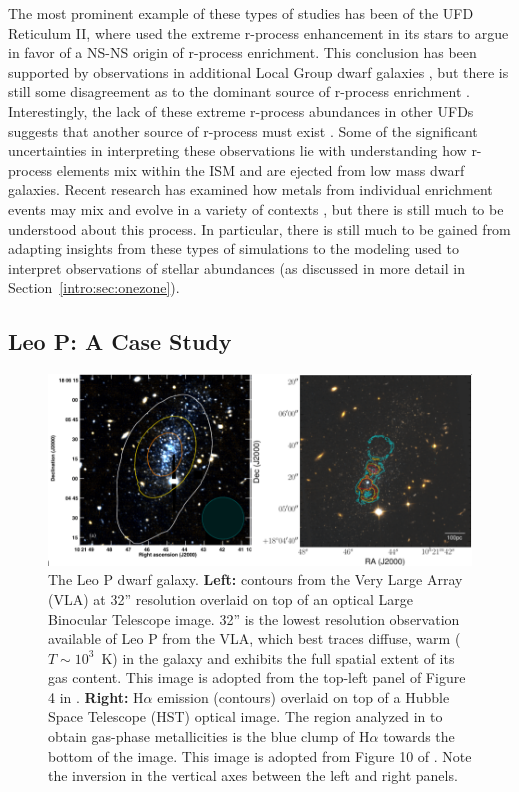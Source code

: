 The most prominent example of these types of studies has been of the UFD Reticulum II, where \cite{Ji2016} used the extreme r-process enhancement in its stars to argue in favor of a NS-NS origin of r-process enrichment. This conclusion has been supported by observations in additional Local Group dwarf galaxies \citep{Duggan2018}, but there is still some disagreement as to the dominant source of r-process enrichment \citep[e.g.][]{Siegel2018}. Interestingly, the lack of these extreme r-process abundances in other UFDs suggests that another source of r-process must exist \citep{Ji2016b}. Some of the significant uncertainties in interpreting these observations lie with understanding how r-process elements mix within the ISM and are ejected from low mass dwarf galaxies. Recent research has examined how metals from individual enrichment events may mix and evolve in a variety of contexts \citep[e.g.][]{Bland-Hawthorn2015,Ritter2015,Montes2016,Safarzadeh2017}, but there is still much to be understood about this process. In particular, there is still much to be gained from adapting insights from these types of simulations to the modeling used to interpret observations of stellar abundances (as discussed in more detail in Section~\ref{intro:sec:onezone}).

\subsection{Leo P: A Case Study}
\label{intro:sec:Leo P}

\begin{figure}
 \centering
 \includegraphics[width=0.975\linewidth]{figures/intro/Leo_P}
 \caption{The Leo P dwarf galaxy. \textbf{Left:} \hi contours from the Very Large Array (VLA) at 32'' resolution overlaid on top of an optical Large Binocular Telescope image. 32'' is the lowest resolution \hi observation available of Leo P from the VLA, which best traces diffuse, warm ($T \sim 10^3$~K) \hi in the galaxy and exhibits the full spatial extent of its gas content. This image is adopted from the top-left panel of Figure 4 in \cite{Bernstein-Cooper2014}. \textbf{Right:} H$\alpha$ emission (contours) overlaid on top of a Hubble Space Telescope (HST) optical image. The \hii region analyzed in \cite{McQuinn2015} to obtain gas-phase metallicities is the blue clump of H$\alpha$ towards the bottom of the image. This image is adopted from Figure 10 of \cite{Evans2019}. Note the inversion in the vertical axes between the left and right panels.}
 \label{intro:fig:Leo P}
\end{figure}

